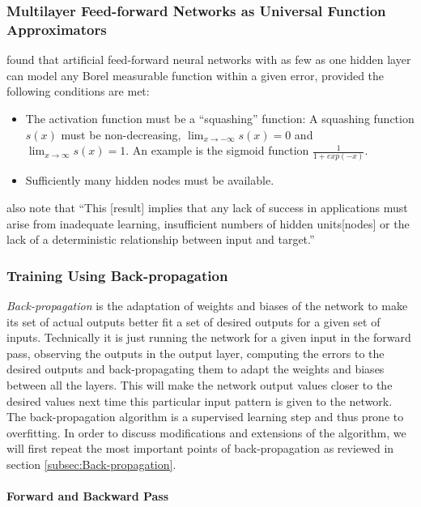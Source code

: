\subsubsection{Multilayer Feed-forward Networks as Universal Function Approximators}

\cite{HornikWhite1989} found that artificial feed-forward neural
networks with as few as one hidden layer can model any Borel measurable
function within a given error, provided the following conditions are
met:

\pagebreak{}
\begin{itemize}
\item The activation function must be a ``squashing'' function: A squashing
function $s(x)$ must be non-decreasing, $\lim_{x\rightarrow-\infty}s(x)=0$
and $\lim_{x\rightarrow\infty}s(x)=1$. An example is the sigmoid
function $\frac{1}{1+exp(-x)}$.
\item Sufficiently many hidden nodes must be available.
\end{itemize}
\cite{HornikWhite1989} also note that ``This {[}result{]} implies
that any lack of success in applications must arise from inadequate
learning, insufficient numbers of hidden units{[}nodes{]} or the lack
of a deterministic relationship between input and target.''

\subsubsection{Training Using Back-propagation}

\emph{Back-propagation} is the adaptation
of weights and biases of the network to make its set of actual outputs
better fit a set of desired outputs for a given set of inputs. Technically
it is just running the network for a given input in the forward pass,
observing the outputs in the output layer, computing the errors to
the desired outputs and back-propagating them to adapt the weights
and biases between all the layers. This will make the network output
values closer to the desired values next time this particular input
pattern is given to the network. The back-propagation algorithm is
a supervised learning step and thus prone to overfitting. In order
to discuss modifications and extensions of the algorithm, we will
first repeat the most important points of back-propagation as reviewed
in section \ref{subsec:Back-propagation}.

\paragraph{Forward and Backward Pass}

